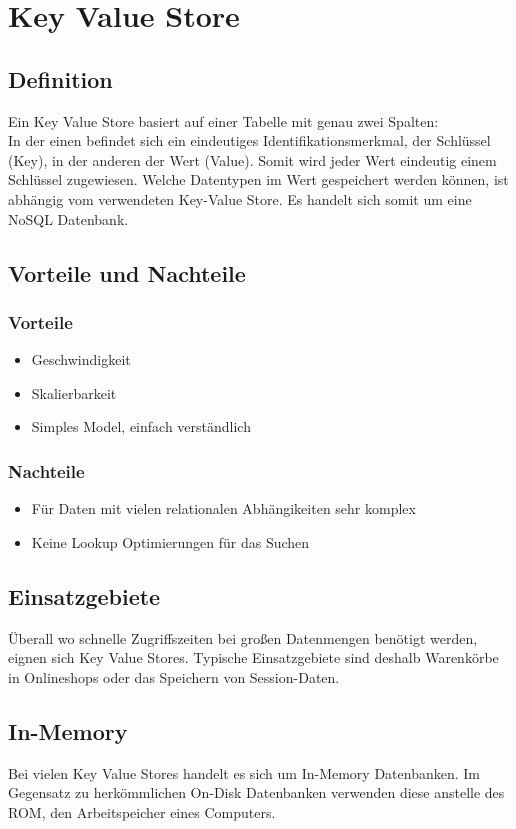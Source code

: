 \section{Key Value Store}
\subsection{Definition}
Ein Key Value Store basiert auf einer Tabelle mit genau zwei Spalten: \\
In der einen befindet sich ein eindeutiges Identifikationsmerkmal, der Schlüssel (Key), in der anderen der Wert (Value).
Somit wird jeder Wert eindeutig einem Schlüssel zugewiesen.
Welche Datentypen im Wert gespeichert werden können, ist abhängig vom verwendeten Key-Value Store.
Es handelt sich somit um eine NoSQL Datenbank.
\subsection{Vorteile und Nachteile}
\subsubsection{Vorteile}
\begin{itemize}
	\item Geschwindigkeit
	\item Skalierbarkeit
	\item Simples Model, einfach verständlich
\end{itemize}
\subsubsection{Nachteile}
\begin{itemize}
	\item Für Daten mit vielen relationalen Abhängikeiten sehr komplex
	\item Keine Lookup Optimierungen für das Suchen
\end{itemize}
\subsection{Einsatzgebiete}
Überall wo schnelle Zugriffszeiten bei großen Datenmengen benötigt werden, eignen sich Key Value Stores. Typische Einsatzgebiete sind deshalb Warenkörbe in Onlineshops oder das Speichern von Session-Daten.

\subsection{In-Memory}
Bei vielen Key Value Stores handelt es sich um In-Memory Datenbanken. Im Gegensatz zu herkömmlichen On-Disk Datenbanken verwenden diese anstelle des ROM, den Arbeitspeicher eines Computers.

